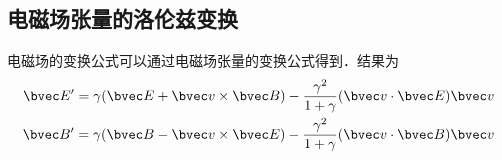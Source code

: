 
\subsection{电磁场张量的洛伦兹变换}

电磁场的变换公式可以通过电磁场张量的变换公式得到．结果为
\begin{equation}
\begin{aligned}
\bvec E'=\gamma(\bvec E+\bvec v\times \bvec B)-\frac{\gamma^2}{1+\gamma}(\bvec v \cdot \bvec E)\bvec v\\
\bvec B'=\gamma(\bvec B-\bvec v\times \bvec E)-\frac{\gamma^2}{1+\gamma}(\bvec v \cdot \bvec B)\bvec v
\end{aligned}
\end{equation}